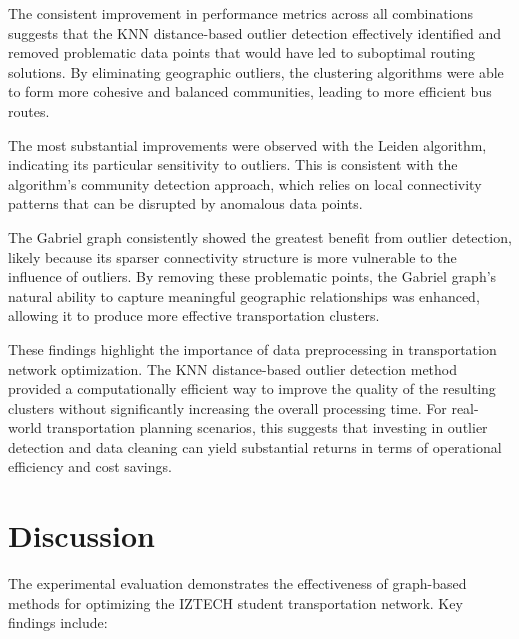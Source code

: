 The consistent improvement in performance metrics across all combinations suggests that the KNN distance-based outlier detection effectively identified and removed problematic data points that would have led to suboptimal routing solutions. By eliminating geographic outliers, the clustering algorithms were able to form more cohesive and balanced communities, leading to more efficient bus routes.

The most substantial improvements were observed with the Leiden algorithm, indicating its particular sensitivity to outliers. This is consistent with the algorithm's community detection approach, which relies on local connectivity patterns that can be disrupted by anomalous data points.

The Gabriel graph consistently showed the greatest benefit from outlier detection, likely because its sparser connectivity structure is more vulnerable to the influence of outliers. By removing these problematic points, the Gabriel graph's natural ability to capture meaningful geographic relationships was enhanced, allowing it to produce more effective transportation clusters.

These findings highlight the importance of data preprocessing in transportation network optimization. The KNN distance-based outlier detection method provided a computationally efficient way to improve the quality of the resulting clusters without significantly increasing the overall processing time. For real-world transportation planning scenarios, this suggests that investing in outlier detection and data cleaning can yield substantial returns in terms of operational efficiency and cost savings.

\section{Discussion}
\label{sec:discussion}

The experimental evaluation demonstrates the effectiveness of graph-based methods for optimizing the IZTECH student transportation network. Key findings include:

